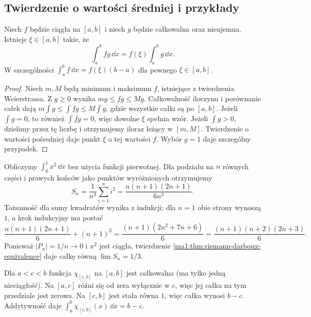 \subsection{Twierdzenie o wartości średniej i przykłady}
\begin{twierdzenie}
\label{ma1:thm:riemann-mean-value}
Niech $f$ będzie ciągła na $[a,b]$ i niech $g$ będzie całkowalna oraz nieujemna. Istnieje $\xi\in[a,b]$ takie, że
\[
 \int_a^b fg\,\dd x=f(\xi)\int_a^b g\,\dd x.
\]
W szczególności $\int_a^b f\,\dd x=f(\xi)(b-a)$ dla pewnego $\xi\in[a,b]$.
\end{twierdzenie}
\begin{proof}
Niech $m,M$ będą minimum i maksimum $f$, istniejące z twierdzenia Weierstrassa. Z $g\ge0$ wynika $mg\le fg\le Mg$. Całkowalność iloczynu i porównanie całek dają
$m\int g\le\int fg\le M\int g$, gdzie wszystkie całki są po $[a,b]$.
Jeżeli $\int g=0$, to również $\int fg=0$, więc dowolne $\xi$ spełnia wzór. Jeżeli $\int g>0$, dzielimy przez tę liczbę i otrzymujemy iloraz leżący w $[m,M]$. Twierdzenie o wartości pośredniej daje punkt $\xi$ o tej wartości $f$. Wybór $g=1$ daje szczególny przypadek.
\end{proof}
\begin{przyklad}
\label{ma1:ex:riemann-square}
Obliczymy $\int_0^1 x^2\,\dd x$ bez użycia funkcji pierwotnej. Dla podziału na $n$ równych części i prawych końców jako punktów wyróżnionych otrzymujemy
\[
 S_n=\frac1{n^3}\sum_{i=1}^n i^2
 =\frac{n(n+1)(2n+1)}{6n^3}.
\]
Tożsamość dla sumy kwadratów wynika z indukcji: dla $n=1$ obie strony wynoszą $1$, a krok indukcyjny ma postać
\[
 \frac{n(n+1)(2n+1)}6+(n+1)^2
 =\frac{(n+1)(2n^2+7n+6)}6
 =\frac{(n+1)(n+2)(2n+3)}6.
\] Ponieważ $|P_n|=1/n\to0$ i $x^2$ jest ciągła, twierdzenie \ref{ma1:thm:riemann-darboux-equivalence} daje całkę równą $\lim S_n=1/3$.
\end{przyklad}
\begin{przyklad}
\label{ma1:ex:riemann-step}
Dla $a<c<b$ funkcja $\chi_{[c,b]}$ na $[a,b]$ jest całkowalna (ma tylko jedną nieciągłość). Na $[a,c]$ różni się od zera wyłącznie w $c$, więc jej całka na tym przedziale jest zerowa. Na $[c,b]$ jest stała równa $1$, więc całka wynosi $b-c$. Addytywność daje $\int_a^b\chi_{[c,b]}(x)\,\dd x=b-c$.
\end{przyklad}

